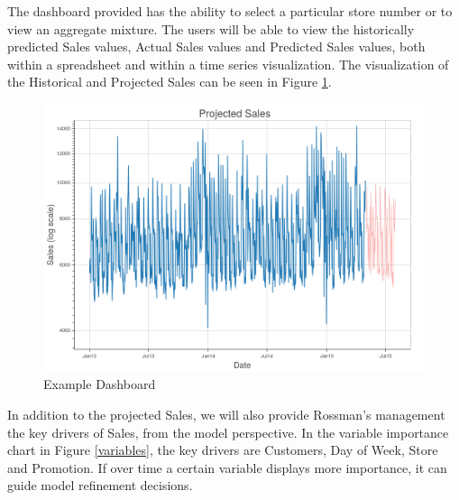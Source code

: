 \documentclass[DIV=calc, paper=a4, fontsize=11pt]{scrartcl}	 %
\begin{document}
The dashboard provided has the ability to select a particular store number or to view an aggregate mixture. The users will be able to view the historically predicted Sales values, Actual Sales values and Predicted Sales values, both within a spreadsheet and within a time series visualization. The visualization of the Historical and Projected Sales can be seen in Figure \ref{dash}. 

\begin{figure}[!htbp]
\centering
\caption{Example Dashboard}
\label{dash}
\includegraphics[width=\textwidth]{figures/dash.png}
\end{figure} 


In addition to the projected Sales, we will also provide Rossman’s management the key drivers of Sales, from the model perspective. In the variable importance chart in Figure \ref{variables}, the key drivers are Customers, Day of Week, Store and Promotion. If over time a certain variable displays more importance, it can guide model refinement decisions.
\end{document}
